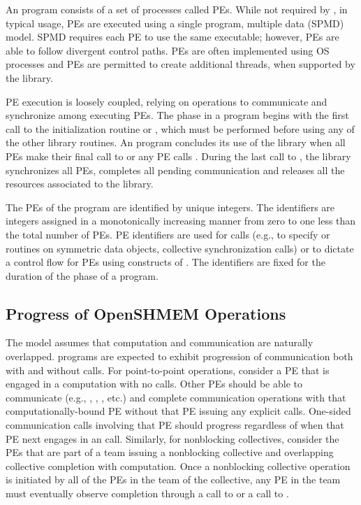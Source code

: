 An \openshmem program consists of a set of \openshmem processes called
\acp{PE}.  While not required by \openshmem, in typical usage, \acp{PE} are
executed using a single program, multiple data (\ac{SPMD}) model.  \ac{SPMD}
requires each \ac{PE} to use the same executable; however, \acp{PE} are able to
follow divergent control paths.  \acp{PE} are often implemented using \ac{OS}
processes and \acp{PE} are permitted to create additional
threads, when supported by the \openshmem library.

\ac{PE} execution is loosely coupled, relying on \openshmem operations to
communicate and synchronize among executing \acp{PE}.  The \openshmem phase in
a program begins with the first call to the initialization routine 
or , which must be performed before using any of the
other \openshmem library routines.
An \openshmem program concludes its use of the \openshmem library when all \acp{PE}
make their final call to
 or any \ac{PE} calls .
During the last call to , the \openshmem library synchronizes
all \acp{PE}, completes all pending communication and releases all the resources
associated to the library.

The \acp{PE} of the \openshmem program are identified by unique integers.  The
identifiers are integers assigned in a monotonically increasing manner from zero
to one less than the total number of \acp{PE}. \ac{PE} identifiers are used for
\openshmem calls (e.g., to specify  or  routines on symmetric
data objects, collective synchronization calls) or to dictate a control flow for
\acp{PE} using constructs of \Cstd. The identifiers are fixed for
the duration of the \openshmem phase of a program.

\subsection{Progress of OpenSHMEM Operations}\label{subsec:progress}

The \openshmem model assumes that computation and communication are naturally
overlapped. \openshmem programs are expected to exhibit progression of
communication both with and without \openshmem calls. For point-to-point
operations, consider a \ac{PE} that is
engaged in a computation with no \openshmem calls. Other \acp{PE} should be able
to communicate (e.g., , , , etc.) and
complete communication operations with that computationally-bound \ac{PE}
without that \ac{PE} issuing any explicit \openshmem calls. One-sided \openshmem
communication calls involving that \ac{PE} should progress regardless of when
that \ac{PE} next engages in an \openshmem call. Similarly,
for nonblocking collectives, consider the \acp{PE} that are part of a team
issuing a nonblocking collective and overlapping collective completion with
computation. Once a nonblocking collective operation is initiated by
all of the \acp{PE} in the team of the collective, any \ac{PE} in the team must
eventually observe completion through a call to  or a
call to .

